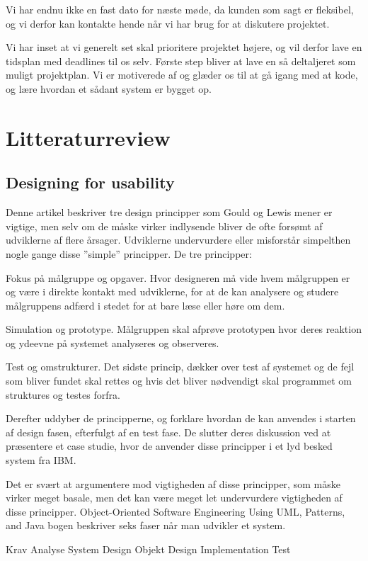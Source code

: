 \documentclass[12pt,a4paper]{article}
\begin{document}
Vi har endnu ikke en fast dato for næste møde, da kunden som sagt er fleksibel, og vi derfor kan kontakte hende når vi har brug for at diskutere projektet.

Vi har inset at vi generelt set skal prioritere projektet højere, og vil derfor lave en tidsplan med deadlines til os selv. Første step bliver at lave en så deltaljeret som muligt projektplan.
Vi er motiverede af og glæder os til at gå igang med at kode, og lære hvordan et sådant system er bygget op. 
\newpage
\section{Litteraturreview}
\subsection{Designing for usability}
Denne artikel beskriver tre design principper som Gould og Lewis mener er vigtige, men selv om de måske virker indlysende bliver de ofte forsømt af udviklerne af flere årsager. Udviklerne undervurdere eller misforstår simpelthen nogle gange disse ”simple” principper. De tre principper: 

Fokus på målgruppe og opgaver. 
Hvor designeren må vide hvem målgruppen er og være i direkte kontakt med udviklerne, for at de kan analysere og studere målgruppens adfærd i stedet for at bare læse eller høre om dem. 

Simulation og prototype.
Målgruppen skal afprøve prototypen hvor deres reaktion og ydeevne på systemet analyseres og observeres.

Test og omstrukturer.
Det sidste princip, dækker over test af systemet og de fejl som bliver fundet skal rettes og hvis det bliver nødvendigt skal programmet om struktures og testes forfra.

Derefter uddyber de principperne, og forklare hvordan de kan anvendes i starten af design fasen, efterfulgt af en test fase. De slutter deres diskussion ved at præsentere et case studie, hvor de anvender disse principper i et lyd besked system fra IBM.   

Det er svært at argumentere mod vigtigheden af disse principper, som måske virker meget basale, men det kan være meget let undervurdere vigtigheden af disse principper. Object-Oriented Software Engineering Using UML, Patterns, and Java bogen beskriver seks faser når man udvikler et system.

Krav
Analyse
System Design
Objekt Design
Implementation
Test
\end{document}
